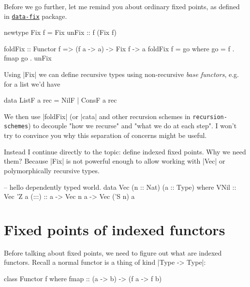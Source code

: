 Before we go further, let me remind you about ordinary fixed points,
as defined in 
\href{https://hackage.haskell.org/package/data-fix}{\texttt{data-fix}}
package.

\begin{code}
newtype Fix f = Fix { unFix :: f (Fix f) }

foldFix :: Functor f => (f a -> a) -> Fix f -> a
foldFix f = go where go = f . fmap go . unFix
\end{code}

Using |Fix| we can define recursive types using non-recursive \emph{base functors},
e.g. for a list we'd have

\begin{code}
data ListF a rec = NilF | ConsF a rec
\end{code}

We then use |foldFix| (or |cata| and other recursion schemes in \texttt{recursion-schemes}) to 
decouple "how we recurse" and "what we do at each step".
I won't try to convince you why this separation of concerns might be useful.

Instead I continue directly to the topic: define indexed fixed points.
Why we need them? Because |Fix| is not powerful enough to allow
working with |Vec| or polymorphically recursive types.

\begin{code}
-- hello dependently typed world.
data Vec (n :: Nat) (a :: Type) where
    VNil  :: Vec 'Z a
    (:::) :: a -> Vec n a -> Vec ('S n) a
\end{code}

\section{Fixed points of indexed functors}

Before talking about fixed points, we need to figure out what
are indexed functors. Recall a normal functor
is a thing of kind |Type -> Type|:

\begin{code}
class Functor f where
    fmap :: (a -> b) -> (f a -> f b)
\end{code}

